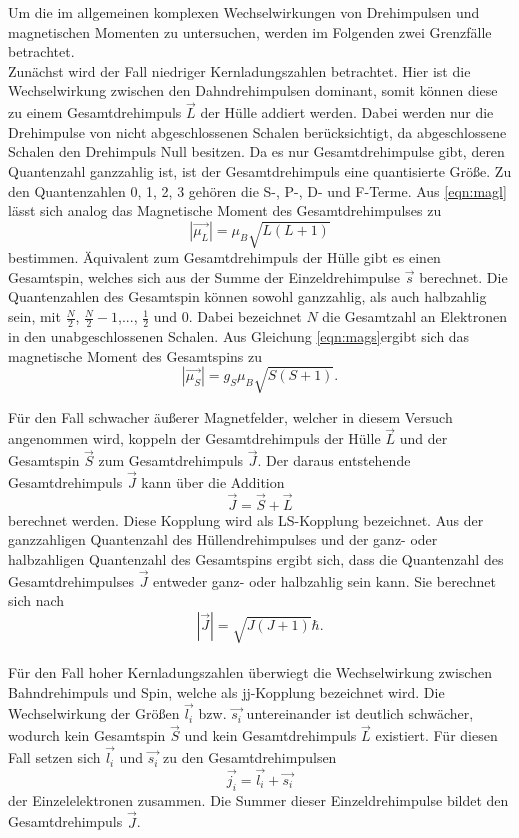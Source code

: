 Um die im allgemeinen komplexen Wechselwirkungen von Drehimpulsen und magnetischen Momenten
zu untersuchen, werden im Folgenden zwei Grenzfälle betrachtet.
\\
Zunächst wird der Fall niedriger Kernladungszahlen betrachtet.
Hier ist die Wechselwirkung zwischen den Dahndrehimpulsen dominant, somit können diese zu einem
Gesamtdrehimpuls $\vec{L}$ der Hülle addiert werden. Dabei werden nur die Drehimpulse von
nicht abgeschlossenen Schalen berücksichtigt, da abgeschlossene Schalen den Drehimpuls  Null
besitzen. Da es nur Gesamtdrehimpulse gibt, deren Quantenzahl ganzzahlig ist, ist der
Gesamtdrehimpuls eine quantisierte Größe. Zu den Quantenzahlen 0, 1, 2, 3 gehören die
S-, P-, D- und F-Terme.
Aus \ref{eqn:magl} lässt sich analog das Magnetische Moment des Gesamtdrehimpulses zu
\begin{equation}
  |\vec{\mu_{L}}|=\mu_B \sqrt{L(L+1)}
\end{equation}
bestimmen.
Äquivalent zum Gesamtdrehimpuls der Hülle gibt es einen Gesamtspin, welches sich aus der
Summe der Einzeldrehimpulse $\vec{s}$ berechnet. Die Quantenzahlen des Gesamtspin können
sowohl ganzzahlig, als auch halbzahlig sein, mit
$\frac{N}{2}$, $\frac{N}{2} -1$,..., $\frac{1}{2}$ und 0. Dabei bezeichnet $N$ die
Gesamtzahl an Elektronen in den unabgeschlossenen Schalen.
Aus Gleichung \ref{eqn:mags}ergibt sich das magnetische Moment des Gesamtspins zu
\begin{equation}
  |\vec{\mu_S}|=g_S\mu_B \sqrt{S(S+1)}.
\end{equation}

Für den Fall schwacher äußerer Magnetfelder, welcher in diesem Versuch angenommen wird, koppeln
der Gesamtdrehimpuls der Hülle $\vec{L}$ und der Gesamtspin $\vec{S}$ zum Gesamtdrehimpuls $\vec{J}$.
Der daraus entstehende Gesamtdrehimpuls $\vec{J}$ kann über die Addition
\begin{equation}
  \vec{J}=\vec{S}+\vec{L}
\end{equation}
berechnet werden. Diese Kopplung wird als LS-Kopplung bezeichnet. Aus der ganzzahligen Quantenzahl des Hüllendrehimpulses und der
ganz- oder halbzahligen Quantenzahl des Gesamtspins ergibt sich, dass die
Quantenzahl des Gesamtdrehimpulses $\vec{J}$ entweder ganz- oder halbzahlig sein kann.
Sie berechnet sich nach
\begin{equation}
  |\vec{J}|=\sqrt{J(J+1)}\hbar.
\end{equation}
\\
Für den Fall hoher Kernladungszahlen überwiegt die Wechselwirkung zwischen
Bahndrehimpuls und Spin, welche als jj-Kopplung bezeichnet wird.
Die Wechselwirkung der Größen $\vec{l_i}$ bzw. $\vec{s_i}$ untereinander ist deutlich
schwächer, wodurch kein Gesamtspin $\vec{S}$ und kein Gesamtdrehimpuls $\vec{L}$ existiert.
Für diesen Fall setzen sich $\vec{l_i}$ und $\vec{s_i}$ zu den Gesamtdrehimpulsen
\begin{equation}
  \vec{j_i}=\vec{l_i} +\vec{s_i}
\end{equation}
der Einzelelektronen zusammen. Die Summer dieser Einzeldrehimpulse bildet
den Gesamtdrehimpuls $\vec{J}$.

